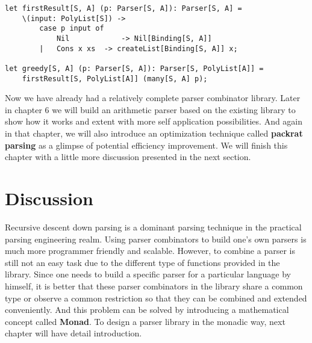 \begin{lstlisting}
let firstResult[S, A] (p: Parser[S, A]): Parser[S, A] =
    \(input: PolyList[S]) ->
        case p input of
            Nil            -> Nil[Binding[S, A]]
        |   Cons x xs  -> createList[Binding[S, A]] x;

let greedy[S, A] (p: Parser[S, A]): Parser[S, PolyList[A]] =
    firstResult[S, PolyList[A]] (many[S, A] p);
\end{lstlisting}

Now we have already had a relatively complete parser combinator library. Later in chapter 6 we will build an arithmetic parser based on the existing library to show how it works and extent with more self application possibilities. And again in that chapter, we will also introduce an optimization technique called \textbf{packrat parsing} as a glimpse of potential efficiency improvement. We will finish this chapter with a little more discussion presented in the next section.

\section{Discussion}
Recursive descent down parsing is a dominant parsing technique in the practical parsing engineering realm. Using parser combinators to build one's own parsers is much more programmer friendly and scalable. However, to combine a parser is still not an easy task due to the different type of functions provided in the library. Since one needs to build a specific parser for a particular language by himself, it is better that these parser combinators in the library share a common type or observe a common restriction so that they can be combined and extended conveniently. And this problem can be solved by introducing a mathematical concept called \textbf{Monad}. To design a parser library in the monadic way, next chapter will have detail introduction.
